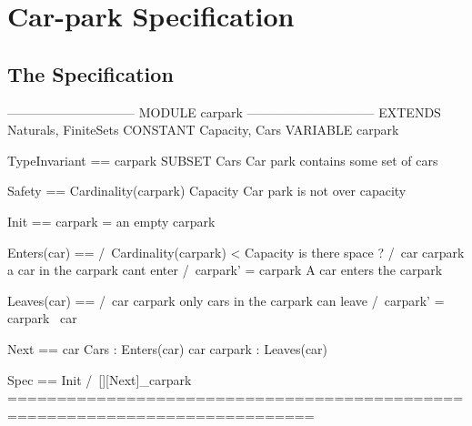 \documentclass[12pt]{article}
\begin{document}
\section{Car-park Specification}\label{lms.report}
\subsection{The Specification} 
\begin{tla}
------------------------------ MODULE carpark ------------------------------
EXTENDS Naturals, FiniteSets
CONSTANT Capacity, Cars
VARIABLE carpark

TypeInvariant == carpark \in SUBSET Cars   \* Car park contains some set of cars

Safety == Cardinality(carpark) \leq Capacity \* Car park is not over capacity 
 

Init == carpark = {}  \* an empty carpark
    
Enters(car) == 
    /\ Cardinality(carpark) < Capacity \* is there space ?
    /\ car \notin carpark  \* a car in the carpark cant enter 
    /\ carpark' = carpark  \* A car enters the carpark

Leaves(car) ==
    /\ car \in carpark \* only cars in the carpark can leave
    /\ carpark' = carpark \ {car}
    
Next ==
    \/ \E car \in Cars : Enters(car)
    \/ \E car \in carpark : Leaves(car)

Spec == Init /\ [][Next]_carpark
=============================================================================
\end{tla}
\begin{tlatex}
\@x{}\moduleLeftDash{}\moduleRightDash\@xx{}%
%
%
%
\@pvspace{8.0pt}%
%
%
\@xx{}%
\@pvspace{8.0pt}%
%
%
\@xx{}%
\@pvspace{16.0pt}%
%
%
\@xx{}%
\@pvspace{8.0pt}%
%
%
%
\@xx{}%
%
%
\@xx{}%
%
%
\@xx{}%
\@pvspace{8.0pt}%
%
%
%
\@xx{}%
\@pvspace{8.0pt}%
%
%
%
\@pvspace{8.0pt}%
\@x{}\bottombar\@xx{}%
\end{tlatex}
\end{document}
